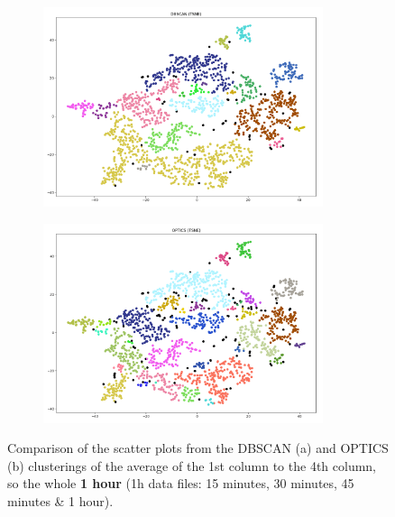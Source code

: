 \begin{figure}[H]
	\centering
	\begin{subfigure}{.5\textwidth}
    \centering
    \includegraphics[width=0.9\textwidth]{./images/clusteringResults/1h-4-DBSCAN.png}
  \end{subfigure}%
  \begin{subfigure}{.5\textwidth}
    \centering
    \includegraphics[width=0.9\textwidth]{./images/clusteringResults/1h-4-OPTICS.png}
	\end{subfigure}
	\caption{Comparison of the scatter plots from the DBSCAN (a) and OPTICS (b) clusterings of the average of the 1st column to the 4th column, so the whole \textbf{1 hour} (1h data files: 15 minutes, 30 minutes, 45 minutes \& 1 hour).}
  \label{figure:finalClustering1h-4}
\end{figure}









